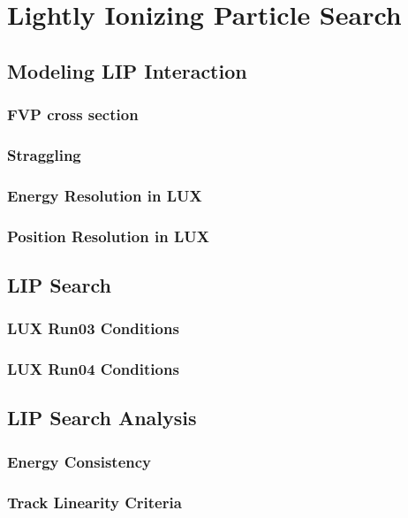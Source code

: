 \chapter{Lightly Ionizing Particle Search}

\label{ch:LIP} %

\section{Modeling LIP Interaction}
\subsection{FVP cross section}
\subsection{Straggling}
\subsection{Energy Resolution in LUX}
\subsection{Position Resolution in LUX}

\section{LIP Search}
\subsection{LUX Run03 Conditions}
\subsection{LUX Run04 Conditions}

\section{LIP Search Analysis}
\subsection{Energy Consistency}
\subsection{Track Linearity Criteria}
